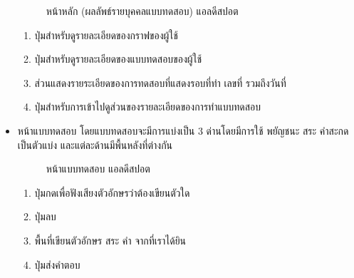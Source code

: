 \documentclass[12pt,oneside,openright,a4paper]{cpe-thai-project}
\begin{document}
\begin{itemize}
\begin{figure}[!ht]
    \caption{หน้าหลัก (ผลลัพธ์รายบุคคลแบบทดสอบ) แอลดีสปอต}\label{fig:endgame}
  \end{figure}
  \begin{enumerate}
    \item ปุ่มสำหรับดูรายละเอียดของกราฟของผู้ใช้
    \item ปุ่มสำหรับดูรายละเอียดของแบบทดสอบของผู้ใช้
    \item ส่วนแสดงรายระเอียดของการทดสอบที่แสดงรอบที่ทำ เลขที่ รวมถึงวันที่
    \item ปุ่มสำหรับการเข้าไปดูส่วนของรายละเอียดของการทำแบบทดสอบ
  \end{enumerate}
  \newpage
  \item หน้าแบบทดสอบ โดยแบบทดสอบจะมีการแบ่งเป็น 3 ด่านโดยมีการใช้ พยัญชนะ สระ คำสะกดเป็นตัวแบ่ง และแต่ละด้านมีพื้นหลังที่ต่างกัน
    \begin{figure}[!ht]\centering
      \setlength{\fboxrule}{0.2mm} %
      \setlength{\fboxsep}{1cm}
      \caption{หน้าแบบทดสอบ แอลดีสปอต}\label{fig:result}
    \end{figure}
    \begin{enumerate}
      \item ปุ่มกดเพื่อฟังเสียงตัวอักษรว่าต้องเขียนตัวใด
      \item ปุ่มลบ
      \item พื้นที่เขียนตัวอักษร สระ คำ จากที่เราได้ยิน
      \item ปุ่มส่งคำตอบ
    \end{enumerate}
    \newpage


\end{itemize}
\end{document}
